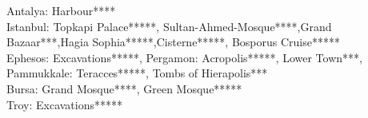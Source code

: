 
Antalya: Harbour****\\
Istanbul: Topkapi Palace*****, Sultan-Ahmed-Mosque****,Grand Bazaar***,Hagia Sophia*****,Cisterne*****, Bosporus Cruise*****\\
Ephesos: Excavations*****, Pergamon: Acropolis*****, Lower Town***,
Pammukkale: Teracces*****, Tombs of Hierapolis***\\
Bursa: Grand Mosque****, Green Mosque*****\\
Troy: Excavations*****